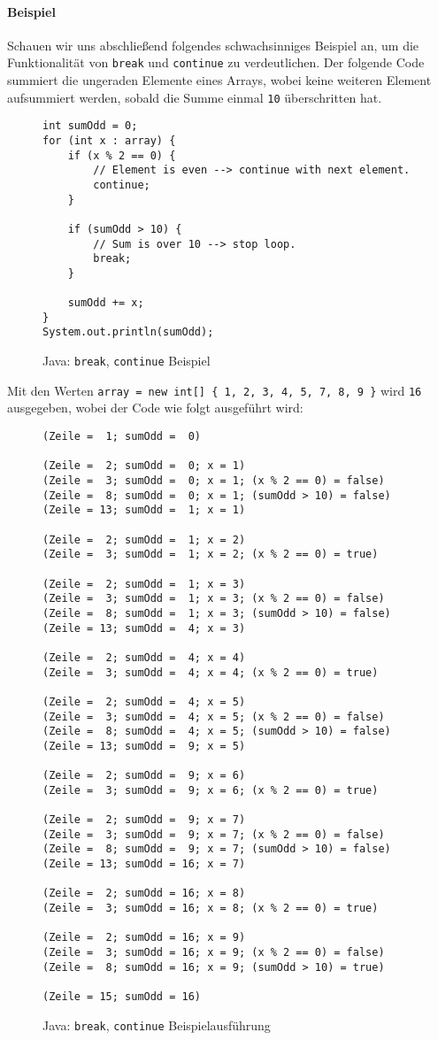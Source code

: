 		\paragraph{Beispiel}
			Schauen wir uns abschließend folgendes schwachsinniges Beispiel an, um die Funktionalität von \texttt{break} und \texttt{continue} zu verdeutlichen. Der folgende Code summiert die ungeraden Elemente eines Arrays, wobei keine weiteren Element aufsummiert werden, sobald die Summe einmal \texttt{10} überschritten hat.
			\begin{figure}[H]
				\centering
				\begin{lstlisting}
int sumOdd = 0;
for (int x : array) {
	if (x % 2 == 0) {
		// Element is even --> continue with next element.
		continue;
	}

	if (sumOdd > 10) {
		// Sum is over 10 --> stop loop.
		break;
	}

	sumOdd += x;
}
System.out.println(sumOdd);
				\end{lstlisting}
				\caption{Java: \texttt{break}, \texttt{continue} Beispiel}
			\end{figure}
			Mit den Werten \texttt{array = new int[] \{ 1, 2, 3, 4, 5, 7, 8, 9 \}} wird \texttt{16} ausgegeben, wobei der Code wie folgt ausgeführt wird:
			\begin{figure}[H]
				\centering
				\begin{lstlisting}
(Zeile =  1; sumOdd =  0)

(Zeile =  2; sumOdd =  0; x = 1)
(Zeile =  3; sumOdd =  0; x = 1; (x % 2 == 0) = false)
(Zeile =  8; sumOdd =  0; x = 1; (sumOdd > 10) = false)
(Zeile = 13; sumOdd =  1; x = 1)

(Zeile =  2; sumOdd =  1; x = 2)
(Zeile =  3; sumOdd =  1; x = 2; (x % 2 == 0) = true)

(Zeile =  2; sumOdd =  1; x = 3)
(Zeile =  3; sumOdd =  1; x = 3; (x % 2 == 0) = false)
(Zeile =  8; sumOdd =  1; x = 3; (sumOdd > 10) = false)
(Zeile = 13; sumOdd =  4; x = 3)

(Zeile =  2; sumOdd =  4; x = 4)
(Zeile =  3; sumOdd =  4; x = 4; (x % 2 == 0) = true)

(Zeile =  2; sumOdd =  4; x = 5)
(Zeile =  3; sumOdd =  4; x = 5; (x % 2 == 0) = false)
(Zeile =  8; sumOdd =  4; x = 5; (sumOdd > 10) = false)
(Zeile = 13; sumOdd =  9; x = 5)

(Zeile =  2; sumOdd =  9; x = 6)
(Zeile =  3; sumOdd =  9; x = 6; (x % 2 == 0) = true)

(Zeile =  2; sumOdd =  9; x = 7)
(Zeile =  3; sumOdd =  9; x = 7; (x % 2 == 0) = false)
(Zeile =  8; sumOdd =  9; x = 7; (sumOdd > 10) = false)
(Zeile = 13; sumOdd = 16; x = 7)

(Zeile =  2; sumOdd = 16; x = 8)
(Zeile =  3; sumOdd = 16; x = 8; (x % 2 == 0) = true)

(Zeile =  2; sumOdd = 16; x = 9)
(Zeile =  3; sumOdd = 16; x = 9; (x % 2 == 0) = false)
(Zeile =  8; sumOdd = 16; x = 9; (sumOdd > 10) = true)

(Zeile = 15; sumOdd = 16)
				\end{lstlisting}
				\caption{Java: \texttt{break}, \texttt{continue} Beispielausführung}
			\end{figure}
